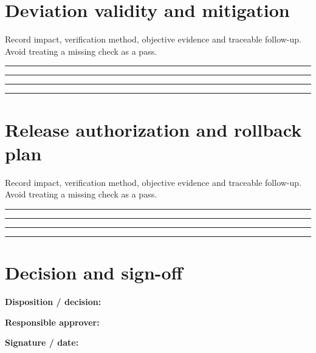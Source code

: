 \documentclass[10pt,letterpaper]{article}
\begin{document}
\section{Deviation validity and mitigation}
Record impact, verification method, objective evidence and traceable follow-up. Avoid treating a missing check as a pass.\par\medskip
\noindent\rule{\linewidth}{0.4pt}\par\vspace{16pt}
\noindent\rule{\linewidth}{0.4pt}\par\vspace{16pt}
\noindent\rule{\linewidth}{0.4pt}\par\vspace{16pt}
\noindent\rule{\linewidth}{0.4pt}\par\vspace{16pt}
\section{Release authorization and rollback plan}
Record impact, verification method, objective evidence and traceable follow-up. Avoid treating a missing check as a pass.\par\medskip
\noindent\rule{\linewidth}{0.4pt}\par\vspace{16pt}
\noindent\rule{\linewidth}{0.4pt}\par\vspace{16pt}
\noindent\rule{\linewidth}{0.4pt}\par\vspace{16pt}
\noindent\rule{\linewidth}{0.4pt}\par\vspace{16pt}
\section{Decision and sign-off}
\noindent\textbf{Disposition / decision:}\quad\hrulefill\par\vspace{11pt}
\noindent\textbf{Responsible approver:}\quad\hrulefill\par\vspace{11pt}
\noindent\textbf{Signature / date:}\quad\hrulefill\par\vspace{11pt}
\end{document}
